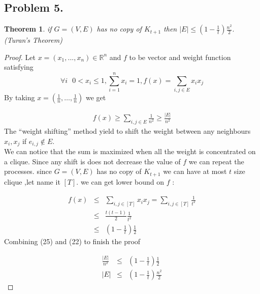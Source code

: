 \documentclass[12pt]{article}
\newtheorem*{theorem*}{Theorem}
\begin{document}
\subsection*{Problem 5.}
\begin{theorem*}
 if $G = (V, E)$ has no copy of $K_{t+1}$ then $|E|\leq (1-\frac{1}{t})\frac{n^2}{2}.$\\(Turan’s Theorem)
\end{theorem*}
\begin{proof}
Let $x = (x_1, . . . , x_n) \in \mathbb{R}^n$ and $f$ to be vector and weight function satisfying \[
\forall i\text{ } 0 <x_i\leq 1,\sum^n_{i=1} x_i = 1,f(x)=\sum_{i,j\in E} x_ix_j \]
By taking $x = (\frac{1}{n},\dots , \frac{1}{n})$ we get \item \begin{eqnarray}
f(x)\geq \sum_{i,j\in E}\frac{1}{n^2}\geq \frac{|E|}{n^2}\end{eqnarray}
The “weight shifting” method yield to shift the weight between any neighbours $x_i,x_j$ if $e_{i,j} \notin E$. \\We can notice that the sum is maximized when all the
weight is concentrated on a clique. Since any shift is does not decrease the value of $f$ we can repeat the processes. since $G = (V, E)$ has no copy of $K_{t+1}$ we can have at most $t$ size clique ,let name it $[T]$. we can get lower bound on $f$ :
\item \begin{eqnarray}
f(x)&\leq & \sum_{i,j\in [T]}x_ix_j=\sum_{i,j\in [T]}\frac{1}{t^2} \\
&\leq & \frac{t(t-1)}{2}\frac{1}{t^2}\\
&\leq & (1-\frac{1}{t})\frac{1}{2}
\end{eqnarray}
Combining (25) and (22) to finish the proof
\item \begin{eqnarray}
\frac{|E|}{n^2}&\leq & (1-\frac{1}{t})\frac{1}{2}\\
|E|&\leq & (1-\frac{1}{t})\frac{n^2}{2}
\end{eqnarray}

\end{proof}
\end{document}
